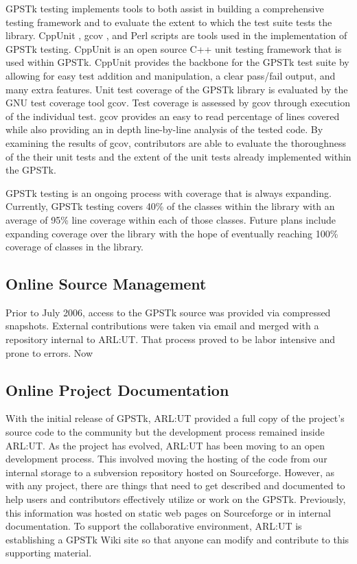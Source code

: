\documentclass{ion-gps}
\begin{document}
GPSTk testing implements tools to both assist in building a
comprehensive testing framework and to evaluate the extent to which
the test suite tests the library. CppUnit \cite{CppUnit}, gcov
\cite{gcov}, and Perl \cite{perl} scripts are tools used in the
implementation of GPSTk testing. CppUnit is an open source C++ unit
testing framework that is used within GPSTk. CppUnit provides the
backbone for the GPSTk test suite by allowing for easy test addition
and manipulation, a clear pass/fail output, and many extra
features. Unit test coverage of the GPSTk library is evaluated by the
GNU test coverage tool gcov. Test coverage is assessed by gcov through
execution of the individual test. gcov provides an easy to read
percentage of lines covered while also providing an in depth
line-by-line analysis of the tested code. By examining the results of
gcov, contributors are able to evaluate the thoroughness of the their
unit tests and the extent of the unit tests already implemented within
the GPSTk.

GPSTk testing is an ongoing process with coverage that is always
expanding. Currently, GPSTk testing covers 40\% of the classes within
the library with an average of 95\% line coverage within each of those
classes.  Future plans include expanding coverage over the library
with the hope of eventually reaching 100\% coverage of classes in the
library.

\subsection*{Online Source Management}
Prior to July 2006, access to the GPSTk source was provided via
compressed snapshots. External contributions were taken via email and
merged with a repository internal to ARL:UT. That process proved to be
labor intensive and prone to errors. Now 

\subsection*{Online Project Documentation}

With the initial release of GPSTk, ARL:UT provided a full copy of the
project's source code to the community but the development
process remained inside ARL:UT.  As the project has evolved, ARL:UT
has been moving to an open development process.  This involved
moving the hosting of the code from our internal storage to a
subversion repository hosted on Sourceforge.  However, as with any
project, there are things that need to get described and documented to
help users and contributors effectively utilize or work on the GPSTk.
Previously, this information was hosted on static web pages on
Sourceforge or in internal documentation.  To support the
collaborative environment, ARL:UT is establishing a GPSTk Wiki site so
that anyone can modify and contribute to this supporting material.
\end{document}
